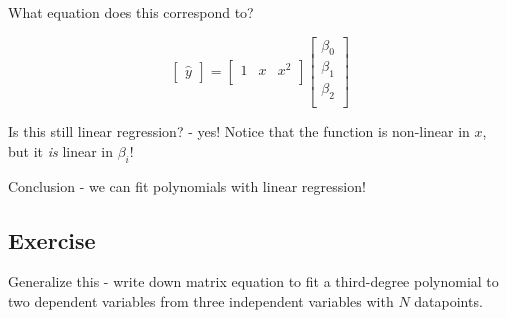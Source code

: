 \documentclass[11pt]{article}
\newcommand\yhat{\hat{y}}
\begin{document}
What equation does this correspond to?

\begin{equation}
    \begin{bmatrix}
        \yhat 
    \end{bmatrix} = 
    \begin{bmatrix}
        1 & x & x^2 \\
    \end{bmatrix}
    \begin{bmatrix}
        \beta_0 \\
        \beta_1 \\
        \beta_2 \\
    \end{bmatrix}
\end{equation}

Is this still linear regression? - yes!
Notice that the function is non-linear in $x$, but it \emph{is} linear
in $\beta_i$!

Conclusion - we can fit polynomials with linear regression!

\subsection{ Exercise }

Generalize this - write down matrix equation to fit a third-degree
polynomial to two dependent variables from three independent variables
with $N$ datapoints.




\end{document}
